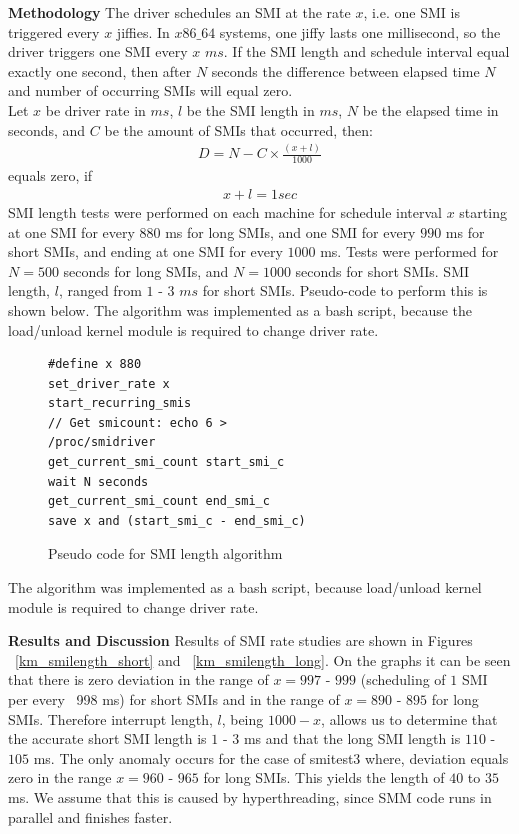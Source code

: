 \documentclass{IEEEtran}
\begin{document}
\textbf{Methodology}
The driver schedules an SMI at the rate $x$, i.e. one SMI is triggered every $x$ jiffies. In $x86\_64$ systems, one jiffy lasts one millisecond, so the driver triggers one SMI every $x$ $ms$. If the SMI length and schedule interval equal exactly one second, then after $N$ seconds the difference between elapsed time $N$ and number of occurring SMIs will equal zero.\\
Let $x$ be driver rate in $ms$, $l$ be the SMI length in $ms$, $N$ be the elapsed time in seconds, and $C$ be the amount of SMIs that occurred, then:\\
\begin{eqnarray}
  D = N-C\times\frac{(x+l)}{1000}
\end{eqnarray}
   equals zero, if 
\begin{eqnarray}
   x+l=1 sec
\end{eqnarray}
SMI length tests were performed on each machine for schedule interval $x$ starting at one SMI for every $880$ ms for long SMIs, and one SMI for every $990$ ms for short SMIs, and ending at one SMI for every $1000$ ms. Tests were performed for $N=500$ seconds for long SMIs, and $N=1000$ seconds for short SMIs. SMI length, $l$, ranged from $1$ - $3$ $ms$ for short SMIs. Pseudo-code to perform this is shown below. The algorithm was implemented as a bash script, because the load/unload kernel module is required to change driver rate.

\begin{figure}[H]
\begin{lstlisting}
#define x 880
set_driver_rate x
start_recurring_smis
// Get smicount: echo 6 >
/proc/smidriver
get_current_smi_count start_smi_c
wait N seconds
get_current_smi_count end_smi_c
save x and (start_smi_c - end_smi_c)
\end{lstlisting}
\caption{Pseudo code for SMI length algorithm}
\label{mk_smilengthpseudo}
\end{figure}

The algorithm was implemented as a bash script, because load/unload kernel module is required to change driver rate.

\textbf{Results and Discussion}
Results of SMI rate studies are shown in Figures ~\ref{km_smilength_short} and ~\ref{km_smilength_long}. On the graphs it can be seen that there is zero deviation in the range of $x=997$ - $999$ (scheduling of $1$ SMI per every ~998 ms) for short SMIs and in the range of $x=890$ - $895$ for long SMIs. Therefore interrupt length, $l$, being $1000-x$, allows us to determine that the accurate short SMI length is $1$ - $3$ ms and that the long SMI length is $110$ - $105$ ms. The only anomaly occurs for the case of smitest3 where, deviation equals zero in the range $x=960$ - $965$ for long SMIs. This yields the length of $40$ to $35$ ms. We assume that this is caused by hyperthreading, since SMM code runs in parallel and finishes faster.
\end{document}
